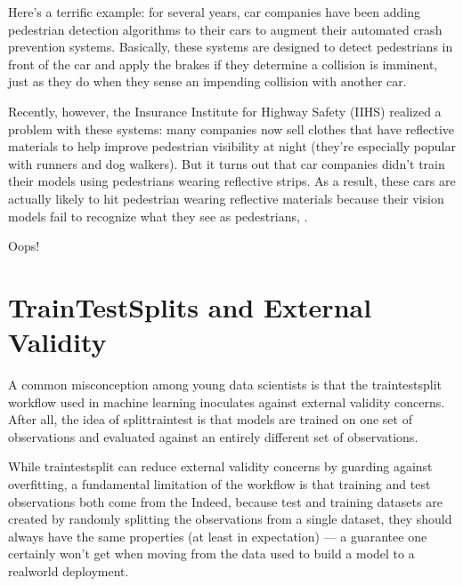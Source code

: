 \documentclass[letterpaper,10pt,english]{jupyterBook}
\begin{document}
\sphinxAtStartPar
Here’s a terrific example: for several years, car companies have been adding pedestrian detection algorithms to their cars to augment their automated crash prevention systems. Basically, these systems are designed to detect pedestrians in front of the car and apply the brakes if they determine a collision is imminent, just as they do when they sense an impending collision with another car.

\sphinxAtStartPar
Recently, however, the Insurance Institute for Highway Safety (IIHS) realized a problem with these systems: many companies now sell clothes that have reflective materials to help improve pedestrian visibility at night (they’re especially popular with runners and dog walkers). But it turns out that car companies didn’t train their models using pedestrians wearing reflective strips. As a result, these cars are actually  likely to hit pedestrian wearing reflective materials because their vision models fail to recognize what they see as pedestrians, .

\sphinxAtStartPar
Oops!


\section{Train\sphinxhyphen{}Test\sphinxhyphen{}Splits and External Validity}
\label{\detokenize{30_questions/27_passive_external_general:train-test-splits-and-external-validity}}
\sphinxAtStartPar
A common misconception among young data scientists is that the train\sphinxhyphen{}test\sphinxhyphen{}split workflow used in machine learning inoculates against external validity concerns. After all, the idea of split\sphinxhyphen{}train\sphinxhyphen{}test is that models are trained on one set of observations and evaluated against an entirely different set of observations.

\sphinxAtStartPar
While train\sphinxhyphen{}test\sphinxhyphen{}split can  reduce external validity concerns by guarding against overfitting, a fundamental limitation of the workflow is that training and test observations both come from the  Indeed, because test and training datasets are created by randomly splitting the observations from a single dataset, they should always have the same properties (at least in expectation) — a guarantee one certainly won’t get when moving from the data used to build a model to a real\sphinxhyphen{}world deployment.
\end{document}
